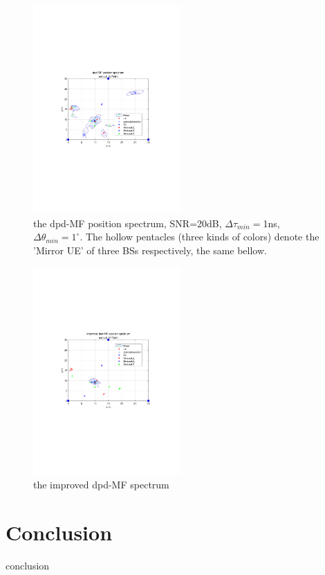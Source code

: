 \documentclass[journal]{IEEEtran}
\begin{document}
\begin{figure}[t]
  \centerline{\includegraphics[width=0.5\textwidth]{figures/dpd-MFspectrum.pdf}}
  \centering
\caption{the dpd-MF position spectrum, SNR=20dB, $\Delta\tau_{min}=$1ns, $\Delta\theta_{min}=1^\circ$. The hollow pentacles (three kinds of colors) denote the 'Mirror UE' of three BSs respectively, the same bellow.}\label{dpd-MFspectrum}
\end{figure}
\begin{figure}[t]
  \centerline{\includegraphics[width=0.5\textwidth]{figures/IprVdpd-MFspectrum.pdf}}
  \centering
\caption{the improved dpd-MF spectrum}\label{IprVdpd-MFspectrum}
\end{figure}
\section{Conclusion}
\label{sec:conclusion}
conclusion
\end{document}
